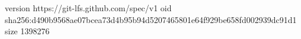 version https://git-lfs.github.com/spec/v1
oid sha256:d490b9568ae07bcea73d4b95b94d5207465801e64f929be658fd002939dc91d1
size 1398276
